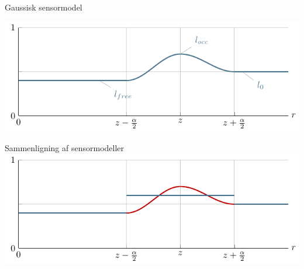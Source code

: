   
\begin{frame}{Gaussisk sensormodel}

\includegraphics{gaussian_sensormodel.pdf}
\end{frame}

\begin{frame}{Sammenligning af sensormodeller}
\includegraphics{combined_sensormodel}
\end{frame}

